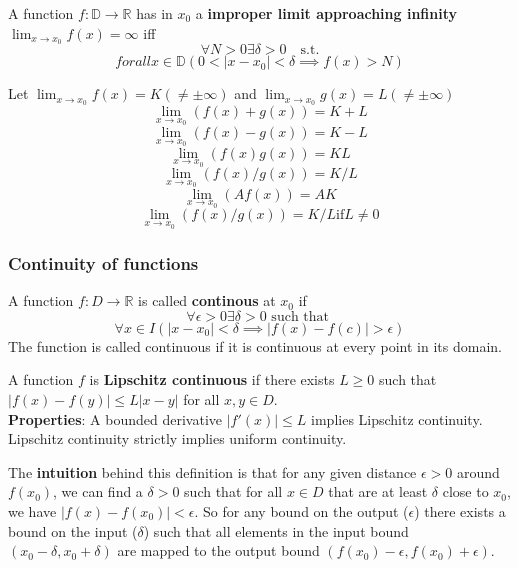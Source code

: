 \begin{definition}
    A function $f: \mathbb{D} \to \mathbb{R}$ has in $x_0$ a \textbf{improper limit approaching infinity} $\lim_{x \to x_0} f(x) = \infty$ iff 
    $$\forall N > 0 \exists \delta > 0 \quad \text{s.t.}$$
    $$forall x \in \mathbb{D} (0 < |x - x_0| < \delta \implies f(x) > N)$$
\end{definition}

\begin{theorem}
    Let $\lim_{x \to x_0} f(x) = K (\neq \pm \infty)$ and $\lim_{x \to x_0} g(x) = L (\neq \pm \infty)$
    $$\lim_{x \to x_0} (f(x) + g(x)) = K + L$$
    $$\lim_{x \to x_0} (f(x) - g(x)) = K - L$$
    $$\lim_{x \to x_0} (f(x) g(x)) = K L$$
    $$\lim_{x \to x_0} (f(x) / g(x)) = K / L$$
    $$\lim_{x \to x_0} (A f(x)) = A K$$
    $$\lim_{x \to x_0} (f(x)/g(x)) = K/L \text{if} L \neq 0$$
\end{theorem}

\subsubsection{Continuity of functions}

\begin{definition}
    A function $f: D \to \mathbb{R}$ is called \textbf{continous} at $x_0$ if
    $$\forall \epsilon \gt 0 \exists \delta \gt 0 \text{ such that }$$
    $$\forall x \in I (\mid x - x_0 \mid \lt \delta \implies \mid f(x) - f(c) \mid \gt \epsilon)$$
    The function is called continuous if it is continuous at every point in its domain.
\end{definition}

\begin{definition}
    A function $f$ is \textbf{Lipschitz continuous} if there exists $L \ge 0$ such that $|f(x) - f(y)| \le L|x - y|$ for all $x, y \in D$. \\
    \textbf{Properties}: A bounded derivative $|f'(x)| \le L$ implies Lipschitz continuity. Lipschitz continuity strictly implies uniform continuity.
\end{definition}

\begin{remark}
    The \textbf{intuition} behind this definition is that for any given distance $\epsilon > 0$ around $f(x_0)$, we can find a $\delta > 0$ such that for all $x \in D$ that are at least $\delta$ close to $x_0$, we have $|f(x) - f(x_0)| < \epsilon$. 
    So for any bound on the output ($\epsilon$) there exists a bound on the input ($\delta$) such that all elements in the input bound $(x_0 - \delta, x_0 + \delta)$ are mapped to the output bound $(f(x_0) - \epsilon, f(x_0) + \epsilon)$.
\end{remark}

